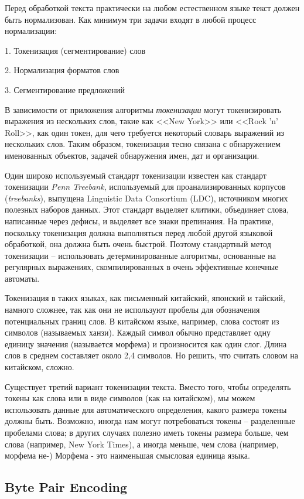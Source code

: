 \documentclass[a4paper,12pt,preview]{report} %
\begin{document}
	Перед обработкой текста практически на любом естественном языке текст должен быть нормализован. Как минимум три задачи входят в любой процесс нормализации:
	
	1. Токенизация (сегментирование) слов
	
	2. Нормализация форматов слов
	
	3. Сегментирование предложений
	 
	В зависимости от приложения алгоритмы \textit{токенизации} могут токенизировать выражения из нескольких слов, такие как <<New York>> или <<Rock 'n' Roll>>, как один токен, для чего требуется некоторый словарь выражений из нескольких слов. Таким образом, токенизация тесно связана с обнаружением именованных объектов, задачей обнаружения имен, дат и	организации.
	
	Один широко используемый стандарт токенизации известен как стандарт токенизации \textit{Penn Treebank}, используемый для проанализированных корпусов (\textit{treebanks}), выпущена Linguistic Data Consortium (LDC), источником многих полезных наборов данных. Этот стандарт выделяет клитики, объединяет слова, написанные через дефисы, и выделяет все знаки препинания.
	На практике, поскольку токенизация должна выполняться перед любой другой языковой обработкой, она должна быть очень быстрой. Поэтому стандартный метод токенизации --
	использовать детерминированные алгоритмы, основанные на регулярных выражениях, скомпилированных в очень эффективные конечные автоматы.
	
	Токенизация в таких языках, как письменный китайский, японский и тайский, намного сложнее, так как они не используют пробелы для обозначения потенциальных границ слов.
	В китайском языке, например, слова состоят из символов (называемых ханзи). Каждый символ обычно представляет одну единицу значения (называется
	морфема) и произносится как один слог. Длина слов в среднем составляет около 2,4 символов. Но решить, что считать словом на китайском, сложно.
	
	
	Существует третий вариант токенизации текста. Вместо того, чтобы определять токены как слова
	или в виде символов (как на китайском), мы можем использовать данные для автоматического определения, какого размера токены должны быть. Возможно, иногда нам могут потребоваться токены -- разделенные пробелами
	слова; в других случаях полезно иметь токены размера больше, чем слова (например, New York Times), а иногда меньше, чем слова (например, морфема не-) Морфема - это наименьшая смысловая единица языка.
	
	\subsection{Byte Pair Encoding}
	
\end{document}
